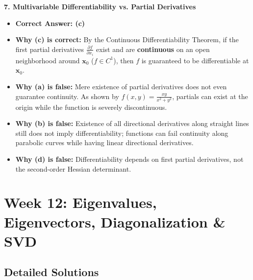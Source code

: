 \textbf{7. Multivariable Differentiability vs. Partial Derivatives}
\begin{itemize}
    \item \textbf{Correct Answer: (c)}
    \item \textbf{Why (c) is correct:} By the Continuous Differentiability Theorem, if the first partial derivatives $\frac{\partial f}{\partial x_i}$ exist and are \textbf{continuous} on an open neighborhood around $\mathbf{x}_0$ ($f \in C^1$), then $f$ is guaranteed to be differentiable at $\mathbf{x}_0$.
    \item \textbf{Why (a) is false:} Mere existence of partial derivatives does not even guarantee continuity. As shown by $f(x, y) = \frac{xy}{x^2 + y^2}$, partials can exist at the origin while the function is severely discontinuous.
    \item \textbf{Why (b) is false:} Existence of all directional derivatives along straight lines still does not imply differentiability; functions can fail continuity along parabolic curves while having linear directional derivatives.
    \item \textbf{Why (d) is false:} Differentiability depends on first partial derivatives, not the second-order Hessian determinant.
\end{itemize}

\section*{Week 12: Eigenvalues, Eigenvectors, Diagonalization \& SVD}

\subsection*{Detailed Solutions}

